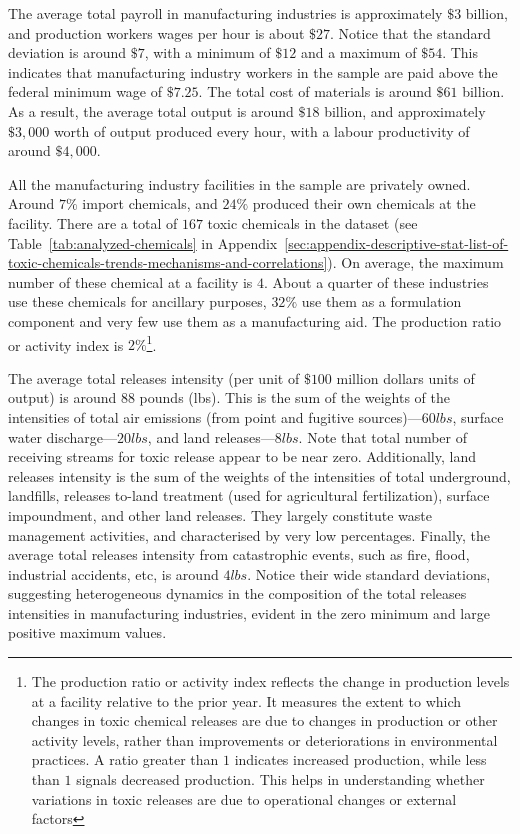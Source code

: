 \documentclass[authoryear, preprint, twocolumn, 1p]{elsarticle}
\begin{document}
    The average total payroll in manufacturing industries is approximately $\$3$ billion, and production workers wages per hour is about $\$27$. Notice that the standard deviation is around $\$7$, with a minimum of $\$12$ and a maximum of $\$54$. This indicates that manufacturing industry workers in the sample are paid above the federal minimum wage of $\$7.25$. The total cost of materials is around $\$61$ billion. As a result, the average total output is around $\$18$ billion, and approximately $\$3,000$ worth of output produced every hour, with a labour productivity of around $\$4,000$.

    All the manufacturing industry facilities in the sample are privately owned. Around $7\%$ import chemicals, and $24\%$ produced their own chemicals at the facility. There are a total of $167$ toxic chemicals in the dataset (see Table~\ref{tab:analyzed-chemicals} in Appendix~\ref{sec:appendix-descriptive-stat-list-of-toxic-chemicals-trends-mechanisms-and-correlations}). On average, the maximum number of these chemical at a facility is $4$. About a quarter of these industries use these chemicals for ancillary purposes, $32\%$ use them as a formulation component and very few use them as a manufacturing aid. The production ratio or activity index is $2\%$\footnote{\tiny The production ratio or activity index reflects the change in production levels at a facility relative to the prior year. It measures the extent to which changes in toxic chemical releases are due to changes in production or other activity levels, rather than improvements or deteriorations in environmental practices. A ratio greater than $1$ indicates increased production, while less than $1$ signals decreased production. This helps in understanding whether variations in toxic releases are due to operational changes or external factors}.
    

    The average total releases intensity (per unit of $\$100$ million dollars units of output) is around $88$ pounds (lbs). This is the sum of the weights of the intensities of total air emissions (from point and fugitive sources)---$60lbs$, surface water discharge---$20lbs$, and land releases---$8lbs$. Note that total number of receiving streams for toxic release appear to be near zero. Additionally, land releases intensity is the sum of the weights of the intensities of total underground, landfills, releases to-land treatment (used for agricultural fertilization), surface impoundment, and other land releases. They largely constitute waste management activities, and characterised by very low percentages. Finally, the average total releases intensity from catastrophic events, such as fire, flood, industrial accidents, etc, is around $4lbs$. Notice their wide standard deviations, suggesting heterogeneous dynamics in the composition of the total releases intensities in manufacturing industries, evident in the zero minimum and large positive maximum values.
\end{document}
